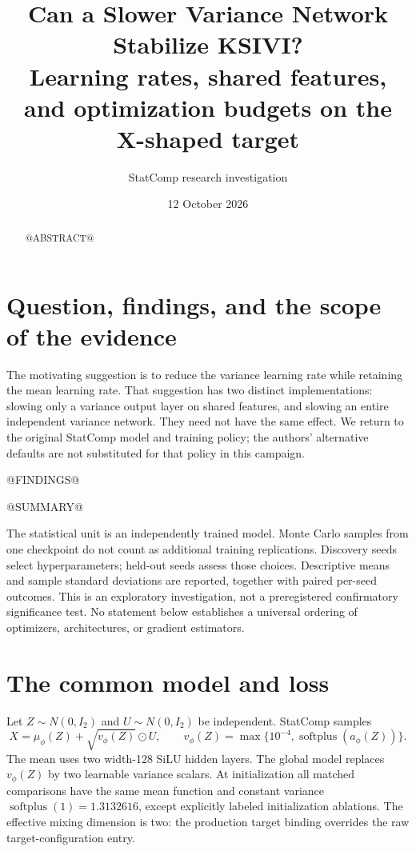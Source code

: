 \documentclass[11pt,a4paper]{article}
\title{Can a Slower Variance Network Stabilize KSIVI?\\
\large Learning rates, shared features, and optimization budgets on the X-shaped target}
\author{StatComp research investigation}\date{12 October 2026}
\begin{document}
\maketitle
\begin{abstract}
@ABSTRACT@
\end{abstract}

\section{Question, findings, and the scope of the evidence}
The motivating suggestion is to reduce the variance learning rate while retaining
the mean learning rate. That suggestion has two distinct implementations:
slowing only a variance output layer on shared features, and slowing an entire
independent variance network. They need not have the same effect. We return to
the original StatComp model and training policy; the authors' alternative
defaults are not substituted for that policy in this campaign.

@FINDINGS@

\begin{center}\small
@SUMMARY@
\end{center}

The statistical unit is an independently trained model. Monte Carlo samples
from one checkpoint do not count as additional training replications. Discovery
seeds select hyperparameters; held-out seeds assess those choices. Descriptive
means and sample standard deviations are reported, together with paired
per-seed outcomes. This is an exploratory investigation, not a preregistered
confirmatory significance test. No statement below establishes a universal
ordering of optimizers, architectures, or gradient estimators.

\section{The common model and loss}
Let $Z\sim N(0,I_2)$ and $U\sim N(0,I_2)$ be independent. StatComp samples
\[
 X=\mu_\phi(Z)+\sqrt{v_\phi(Z)}\odot U,\qquad
 v_\phi(Z)=\max\{10^{-4},\operatorname{softplus}(a_\phi(Z))\}.
\]
The mean uses two width-128 SiLU hidden layers. The global model replaces
$v_\phi(Z)$ by two learnable variance scalars. At initialization all matched
comparisons have the same mean function and constant variance
$\operatorname{softplus}(1)=1.3132616$, except explicitly labeled initialization
ablations. The effective mixing dimension is two: the production target binding
overrides the raw target-configuration entry.
\end{document}
